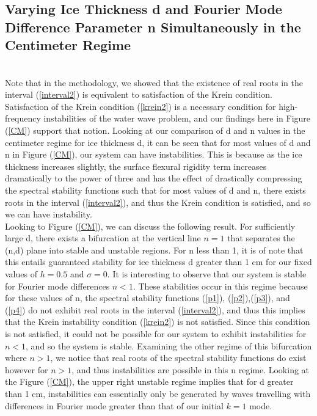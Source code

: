 \documentclass{article}
\begin{document}
\subsection{Varying Ice Thickness d and Fourier Mode Difference Parameter  n Simultaneously in the Centimeter Regime}
\\

Note that in the methodology, we showed that the existence of real roots in the interval (\ref{interval2}) is equivalent to satisfaction of the Krein condition. Satisfaction of the Krein condition (\ref{krein2}) is a necessary condition for high-frequency instabilities of the water wave problem, and our findings here in Figure (\ref{CM}) support that notion. Looking at our comparison of d and n values in the centimeter regime for ice thickness d, it can be seen that for most values of d and n in Figure (\ref{CM}), our system can have instabilities. This is because as the ice thickness increases slightly, the surface flexural rigidity term increases dramatically to the power of three and has the effect of drastically compressing the spectral stability functions such that for most values of d and n, there exists roots in the interval (\ref{interval2}), and thus the Krein condition is satisfied, and so we can have instability. 
\\

Looking to Figure (\ref{CM}), we can discuss the following result. For sufficiently large d, there exists a bifurcation at the vertical line \(n = 1\) that separates the (n,d) plane into stable and unstable regions. For n less than 1, it is of note that this entails guaranteed stability for ice thickness d greater than 1 cm for our fixed values of \(h = 0.5\) and \(\sigma = 0\). It is interesting to observe that our system is stable for Fourier mode differences \(n<1\). These stabilities occur in this regime because for these values of n, the spectral stability functions (\ref{p1}), (\ref{p2}),(\ref{p3}), and (\ref{p4}) do not exhibit real roots in the interval (\ref{interval2}), and thus this implies that the Krein instability condition (\ref{krein2}) is not satisfied. Since this condition is not satisfied, it could not be possible for our system to exhibit instabilities for \(n<1\), and so the system is stable. Examining the other regime of this bifurcation where \(n > 1\), we notice that real roots of the spectral stability functions do exist however for \(n>1\), and thus instabilities are possible in this n regime. Looking at the Figure (\ref{CM}), the upper right unstable regime implies that for d greater than 1 cm, instabilities can essentially only be generated by waves travelling with differences in Fourier mode greater than that of our initial \(k = 1\) mode.  
\\
\end{document}
